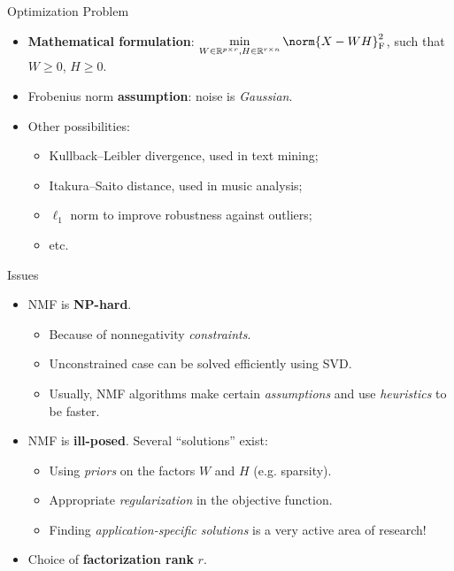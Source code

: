 \begin{frame}{Optimization Problem}
\begin{itemize}
\item<1-> \textbf{Mathematical formulation}: \(\displaystyle \min_{W \in \mathbb{R}^{p \times r}, H \in \mathbb{R}^{r \times n}} \norm{X - WH}^2_{\textnormal{F}}\), such that \(W \geqslant 0\), \(H \geqslant 0\).
\item<2-> Frobenius norm \textbf{assumption}: noise is \emph{Gaussian}.
\item<3-> Other possibilities:
\begin{itemize}
    \item Kullback--Leibler divergence, used in text mining;
    \item Itakura--Saito distance, used in music analysis;
    \item \(\ell_1\) norm to improve robustness against outliers;
    \item etc.
\end{itemize}
\end{itemize}
\end{frame}

\begin{frame}{Issues}
\begin{itemize}
\item<1-> NMF is \textbf{NP-hard}.
\begin{itemize}
    \item Because of nonnegativity \emph{constraints}.
    \item Unconstrained case can be solved efficiently using SVD.
    \item Usually, NMF algorithms make certain \emph{assumptions} and use \emph{heuristics} to be faster.
\end{itemize}
\item<2-> NMF is \textbf{ill-posed}. Several ``solutions'' exist:
\begin{itemize}
    \item Using \emph{priors} on the factors \(W\) and \(H\) (e.g. sparsity).
    \item Appropriate \emph{regularization} in the objective function.
    \item Finding \emph{application-specific solutions} is a very active area of research!
\end{itemize}
\item<3-> Choice of \textbf{factorization rank} \(r\).
\end{itemize}
\end{frame}